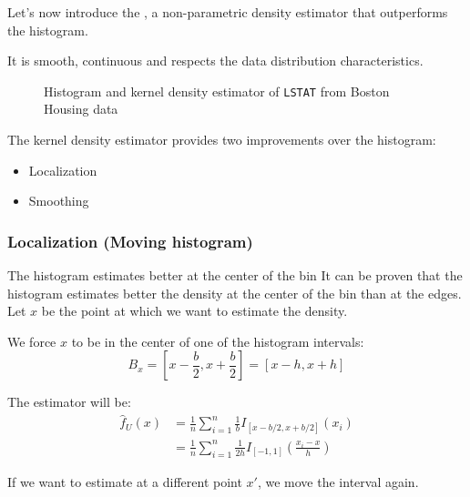 Let's now introduce the , a non-parametric
density estimator that outperforms the histogram.

It is smooth, continuous and respects the data distribution characteristics.

\begin{figure}[H]
	\caption{Histogram and kernel density estimator of \texttt{LSTAT} from Boston Housing data}%
\end{figure}

The kernel density estimator provides two improvements over the histogram:
\begin{itemize}
	\item Localization
	\item Smoothing
\end{itemize}

\subsubsection{Localization (Moving histogram)}
\begin{prop}{The histogram estimates better at the center of the bin}{}
	It can be proven that the histogram estimates better the density at the center of the
	bin than at the edges.
	\tcblower
	Let $x$ be the point at which we want to estimate the density.

	We force $x$ to be in the center of one of the histogram intervals:
	\begin{equation*}
		B_x = \left[ x - \frac{b}{2}, x + \frac{b}{2} \right] = [ x - h, x + h ]
	\end{equation*}

	The estimator will be:
	\begin{align*}
		\widehat{f}_U(x) & = \frac{1}{n}\sum_{i=1}^n \frac{1}{b} I_{[x - b/2, x + b/2]}(x_i)                  \\
		                 & = \frac{1}{n}\sum_{i=1}^n \frac{1}{2h} I_{[-1, 1]}\left( \frac{x_i - x}{h} \right)
	\end{align*}

	If we want to estimate at a different point $x'$, we move the interval again.
\end{prop}

